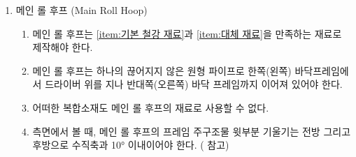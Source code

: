\documentclass[final,a4paper,10pt]{report}
\begin{document}
\begin{enumerate}
\begin{enumerate}
      \item\label{rule:formula-technical.roll-hoops.common.min-bend-radius-3xod} 파이프 벤딩의 최소 반경은 파이프의 중심선에서부터 측정하였을 때 파이프 외경의 3배를 넘어야 한다.
      \item\label{rule:formula-technical.roll-hoops.common.crease-and-ovality-limit} 벤딩 부위에 벤딩으로 인한 주름이 없어야 하며 벤딩에 의해 최소 외경이 벤딩 전 원래 외경보다 15\% 이상 줄어들지 않아야 한다.
      \item\label{rule:formula-technical.roll-hoops.common.gusset-bracing-at-attachment} 메인 롤 후프 및 전방 롤 후프를 프레임 주 구조물에 확실히 부착하기 위해 적절한 보강판과 삼각형 구조의 보강재 사용을 권장한다.


      \begin{itemize}
        \item 어떠한 조향각에서도 조향휠은 전방 롤 후프 최상단부 보다 아래에 위치해야 하며, 조향휠을\\
        잡은 손이 메인 롤 후프의 최상부와 전방 롤 후프 최상부에 접하는 연장선 안에 있어야 한다.
      \end{itemize}


      \item\label{rule:formula-technical.roll-hoops.common.inspection-hole-5mm} 메인 롤 후프 및 전방 롤 후프의 직선부 내에서 상단 바깥쪽에 파이프의 두께를 검사하기 위한 직경 5mm의 검사구멍을 아래와 같이 표시된 곳에 뚫어 놓아야 한다. ( 참고)
    \end{enumerate}

  \item\label{rule:formula-technical.roll-hoops.main-roll-hoop} 메인 롤 후프 (Main Roll Hoop) \label{item:메인 롤 후프}
    \begin{enumerate}
      \item\label{rule:formula-technical.roll-hoops.main-roll-hoop.material-compliance} 메인 롤 후프는 \ref{item:기본 철강 재료}과 \ref{item:대체 재료}을 만족하는 재료로 제작해야 한다.
      \item\label{rule:formula-technical.roll-hoops.main-roll-hoop.continuous-tube-both-sides} 메인 롤 후프는 하나의 끊어지지 않은 원형 파이프로 한쪽(왼쪽) 바닥프레임에서 드라이버 위를 지나 반대쪽(오른쪽) 바닥 프레임까지 이어져 있어야 한다.
      \item\label{rule:formula-technical.roll-hoops.main-roll-hoop.no-composite-material} 어떠한 복합소재도 메인 롤 후프의 재료로 사용할 수 없다.
      \item\label{rule:formula-technical.roll-hoops.main-roll-hoop.max-tilt-10deg} 측면에서 볼 때, 메인 롤 후프의 프레임 주구조물 윗부분 기울기는 전방 그리고 후방으로 수직축과 10° 이내이어야 한다. ( 참고)


\end{enumerate}
\end{enumerate}
\end{document}
